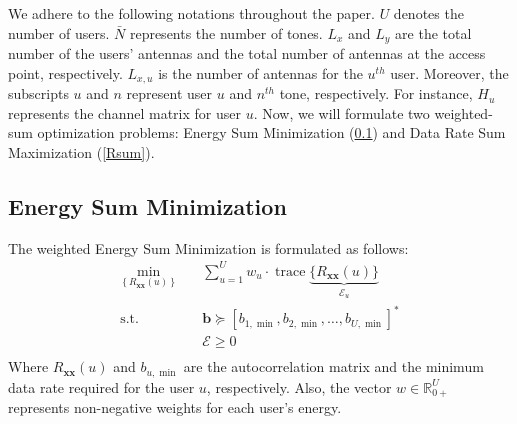 We adhere to the following notations throughout the paper. $U$ denotes the number of users. $\bar{N}$ represents the number of tones. $L_x$ and $L_y$ are the total number of the users' antennas and the total number of antennas at the access point, respectively. $L_{x,u}$ is the number of antennas for the $u^{th}$ user. Moreover, the subscripts $u$ and $n$ represent user $u$ and $n^{th}$ tone, respectively. For instance, $H_u$ represents the channel matrix for user $u$. 
Now, we will formulate two weighted-sum optimization problems: Energy Sum Minimization (\ref{Esum}) and Data Rate Sum Maximization (\ref{Rsum}).
\subsection{Energy Sum Minimization} \label{Esum}
The weighted Energy Sum Minimization is formulated as follows:
\begin{equation}
\begin{aligned}
\min_{\left\{R_{\boldsymbol{xx}}{(u)} \right\}} \quad & \sum_{u=1}^U w_u \cdot \operatorname{trace} \underbrace{\{R_{ \boldsymbol{x} \boldsymbol{x}}{(u)}\}}_{\mathcal{E}_u}\\
\textrm{s.t.} \quad & \mathbf{b} \succeq \left[b_{1, \min }, b_{2, \min }, \ldots, b_{U, \min }\right]^*\\
  &\mathcal{E}\geq0    \\
\end{aligned}
\end{equation}
Where $R_{\boldsymbol{xx}}(u)$ and $b_{u,\operatorname{min}}$ are the autocorrelation matrix and the minimum data rate required for the user $u$, respectively. Also, the vector $w \in \mathbb{R}_{0+}^U$ represents non-negative weights for each user's energy.


